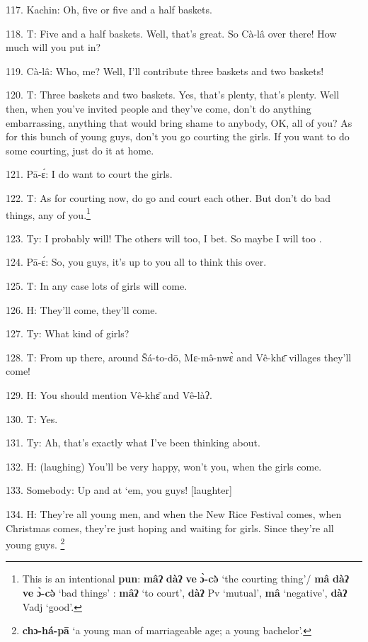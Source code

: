 117. Kachin: Oh, five or five and a half baskets.

118. T: Five and a half baskets. Well, that's great. So Cà-lâ over there!
How much will you put in?

119. Cà-lâ: Who, me? Well, I'll contribute three baskets\textit{ }and two baskets!

120. T: Three baskets\textit{ }and two baskets. Yes, that's plenty, that's plenty.
Well then, when you've invited people and they've come, don't do anything embarrassing,
anything that would bring shame to anybody, OK, all of you? As for this bunch
of young guys, don't you go courting the girls. If you want to do some courting,
just do it at home.

121. Pā-ɛ́: I do want to court the girls. 

122. T: As for courting now, do go and court each other. But don't do bad things,
any of you.\footnote{This is an intentional \textbf{pun}: \textbf{mâʔ} \textbf{dàʔ} \textbf{ve} \textbf{ɔ̀-cə̀} `the courting thing'/ \textbf{mâ} \textbf{dàʔ} \textbf{ve} \textbf{ɔ̀-cə̀} `bad things' : \textbf{mâʔ} `to court', \textbf{dàʔ} Pv `mutual', \textbf{mâ} `negative', \textbf{dàʔ} Vadj `good'.}

123. Ty: I probably will! The others will too, I bet. So maybe I will too
.

124. Pā-ɛ́: So, you guys, it's up to you all to think this over.

125. T: In any case lots of girls will come.

126. H: They'll come, they'll come.

127. Ty: What kind of girls?

128. T: From up there, around Šá-to-dō, Mɛ-mə̂-nwɛ̀ and Vê-khɛ̄ villages
they'll come!

129. H: You should mention Vê-khɛ̄ and Vê-làʔ.

130. T: Yes.

131. Ty: Ah, that's exactly what I've been thinking about.

132. H: (laughing) You'll be very happy, won't you, when the girls come.

133. Somebody: Up and at `em, you guys! [laughter]

134. H: They're all young men, and when the New Rice Festival comes, when Christmas
comes, they're just hoping and waiting for girls. Since they're all young guys.
\footnote{\textbf{chɔ-há-pā} `a young man of marriageable age; a young bachelor'.}

